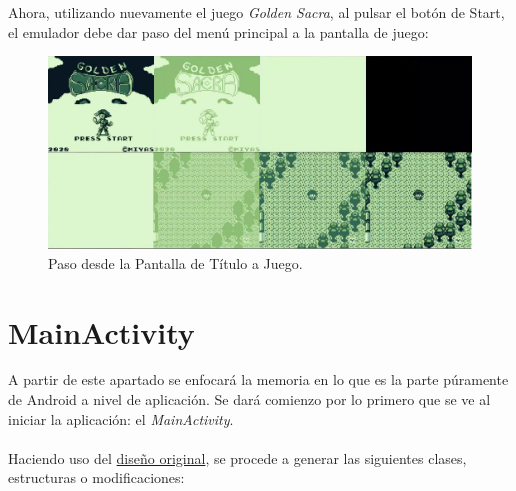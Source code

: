 Ahora, utilizando nuevamente el juego \textit{Golden Sacra}, al pulsar el botón de Start, el emulador debe dar paso del menú principal a la pantalla de juego:

\begin{figure}[H]
    \centering
    \includegraphics[width=1\textwidth]{include/images/transition_title.png}
    \caption{Paso desde la Pantalla de Título a Juego.}\label{figure:transition_title}
\end{figure}

\section{MainActivity}

A partir de este apartado se enfocará la memoria en lo que es la parte púramente de Android a nivel de aplicación. Se dará comienzo por lo primero que se ve al iniciar la aplicación: el \textit{MainActivity}.
\\\\
Haciendo uso del \hyperref[figure:mockupmenu]{diseño original}, se procede a generar las siguientes clases, estructuras o modificaciones:

